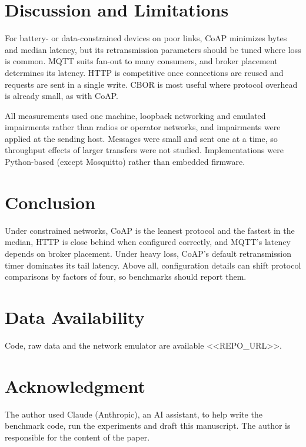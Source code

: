 \documentclass[conference]{IEEEtran}
\begin{document}
\section{Discussion and Limitations}
For battery- or data-constrained devices on poor links, CoAP minimizes bytes and median latency, but its retransmission parameters should be tuned where loss is common. MQTT suits fan-out to many consumers, and broker placement determines its latency. HTTP is competitive once connections are reused and requests are sent in a single write. CBOR is most useful where protocol overhead is already small, as with CoAP.

All measurements used one machine, loopback networking and emulated impairments rather than radios or operator networks, and impairments were applied at the sending host. Messages were small and sent one at a time, so throughput effects of larger transfers were not studied. Implementations were Python-based (except Mosquitto) rather than embedded firmware.

\section{Conclusion}
Under constrained networks, CoAP is the leanest protocol and the fastest in the median, HTTP is close behind when configured correctly, and MQTT's latency depends on broker placement. Under heavy loss, CoAP's default retransmission timer dominates its tail latency. Above all, configuration details can shift protocol comparisons by factors of four, so benchmarks should report them.

\section*{Data Availability}
Code, raw data and the network emulator are available <<REPO_URL>>.

\section*{Acknowledgment}
The author used Claude (Anthropic), an AI assistant, to help write the benchmark code, run the experiments and draft this manuscript. The author is responsible for the content of the paper.



\end{document}
